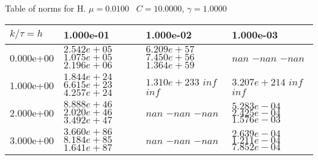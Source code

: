 \begin{center}
Table of norms for H. $\mu = 0.0100$ \, $C = 10.0000$, $\gamma = 1.0000$
  
\begin{tabular}{|p{1in}|p{1in}|p{1in}|p{1in}|} \hline
$k / \tau = h$ &1.000e-01 &1.000e-02 &1.000e-03 \\ \hline 
0.000e+00 & $2.542e+05$  $1.075e+05$  $2.196e+06$  & $6.209e+57$  $7.450e+56$  $1.364e+59$  & $nan$  $-nan$  $-nan$  \\ \hline 
1.000e+00 & $1.844e+24$  $6.615e+23$  $4.257e+24$  & $1.310e+233$  $inf$  $inf$  & $3.207e+214$  $inf$  $inf$  \\ \hline 
2.000e+00 & $8.888e+46$  $2.020e+46$  $3.492e+47$  & $nan$  $-nan$  $-nan$  & $5.283e-04$  $2.425e-04$  $1.576e-03$  \\ \hline 
3.000e+00 & $3.660e+86$  $8.184e+85$  $1.641e+87$  & $nan$  $-nan$  $-nan$  & $2.639e-04$  $1.211e-04$  $7.852e-04$  \\ \hline 

\end{tabular}\\[20pt]
\end{center}
